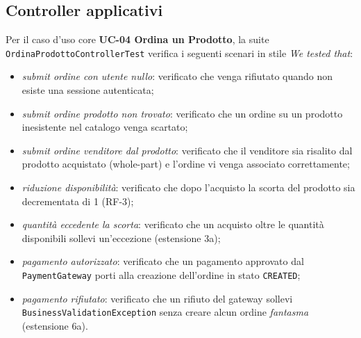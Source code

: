 \subsection{Controller applicativi}
Per il caso d'uso core \textbf{UC-04 Ordina un Prodotto}, la suite
\texttt{OrdinaProdottoControllerTest} verifica i seguenti scenari in stile
\emph{We tested that}: 
\begin{itemize}
  \item \emph{submit ordine con utente nullo}: verificato che venga rifiutato
  quando non esiste una sessione autenticata;
  \item \emph{submit ordine prodotto non trovato}: verificato che un ordine su un
  prodotto inesistente nel catalogo venga scartato;
  \item \emph{submit ordine venditore dal prodotto}: verificato che il venditore
  sia risalito dal prodotto acquistato (whole-part) e l'ordine vi venga
  associato correttamente;
  \item \emph{riduzione disponibilità}: verificato che dopo l'acquisto la
  scorta del prodotto sia decrementata di 1 (RF-3);
  \item \emph{quantità eccedente la scorta}: verificato che un acquisto oltre le
  quantità disponibili sollevi un'eccezione (estensione 3a);
  \item \emph{pagamento autorizzato}: verificato che un pagamento approvato dal
  \texttt{PaymentGateway} porti alla creazione dell'ordine in stato
  \texttt{CREATED};
  \item \emph{pagamento rifiutato}: verificato che un rifiuto del gateway
  sollevi \texttt{BusinessValidationException} senza creare alcun ordine
  \emph{fantasma} (estensione 6a).
\end{itemize}

